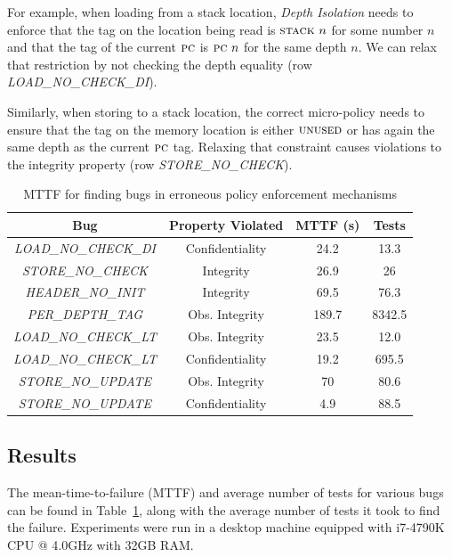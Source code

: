 \documentclass[10pt,conference]{ieeetran}%
\theoremstyle{definition}
\begin{document}
For example, when loading from a stack location, {\em Depth Isolation}
needs to enforce that the tag on the location being read
is $\textsc{stack} ~ n$ for some number $n$ and that the tag of the
current $\textsc{pc}$ is $\textsc{pc} ~ n$ for the same depth $n$. We can relax
that restriction by not checking the depth equality (row {\em
  LOAD\_NO\_CHECK\_DI}).

Similarly, when storing to a stack location, the correct micro-policy
needs to ensure that the tag on the memory location is either
$\textsc{unused}$ or has again the same depth as the current $\textsc{pc}$
tag. Relaxing that constraint causes violations to the integrity
property (row {\em STORE\_NO\_CHECK}).

\begin{table}[]
\centering
\begin{tabular}{c|c|c|c}
  Bug & Property Violated & MTTF (s) & Tests \\
  \hline
      {\em LOAD\_NO\_CHECK\_DI}  & Confidentiality & 24.2 & 13.3 \\
      {\em STORE\_NO\_CHECK} & Integrity & 26.9 & 26 \\
      {\em HEADER\_NO\_INIT} & Integrity & 69.5 & 76.3 \\
  \hline
  \hline
      {\em PER\_DEPTH\_TAG} & Obs. Integrity & 189.7 & 8342.5  \\
      {\em LOAD\_NO\_CHECK\_LT}  & Obs. Integrity & 23.5 & 12.0 \\
      {\em LOAD\_NO\_CHECK\_LT}  & Confidentiality & 19.2 & 695.5 \\
      {\em STORE\_NO\_UPDATE} & Obs. Integrity & 70 & 80.6  \\
      {\em STORE\_NO\_UPDATE} & Confidentiality & 4.9 & 88.5 \\
  \hline
\end{tabular}
\vspace*{1em}
\caption{MTTF for finding bugs in erroneous policy enforcement mechanisms}
\vspace*{-2em}
\label{tab:bug-table}
\end{table}

\subsection{Results}

The mean-time-to-failure (MTTF) and average number of tests for various bugs can be found in
Table~\ref{tab:bug-table}, along with the average number of tests
it took to find the failure. Experiments were run in a desktop
machine equipped with i7-4790K CPU @ 4.0GHz with 32GB RAM.
\end{document}
